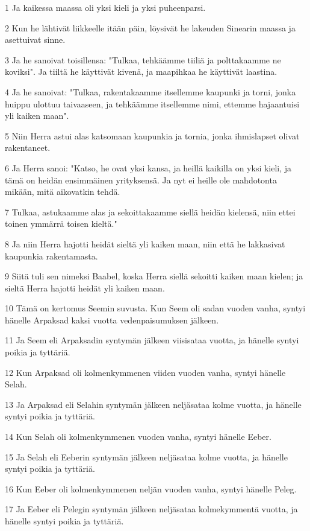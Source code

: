 \par 1 Ja kaikessa maassa oli yksi kieli ja yksi puheenparsi.
\par 2 Kun he lähtivät liikkeelle itään päin, löysivät he lakeuden Sinearin maassa ja asettuivat sinne.
\par 3 Ja he sanoivat toisillensa: "Tulkaa, tehkäämme tiiliä ja polttakaamme ne koviksi". Ja tiiltä he käyttivät kivenä, ja maapihkaa he käyttivät laastina.
\par 4 Ja he sanoivat: "Tulkaa, rakentakaamme itsellemme kaupunki ja torni, jonka huippu ulottuu taivaaseen, ja tehkäämme itsellemme nimi, ettemme hajaantuisi yli kaiken maan".
\par 5 Niin Herra astui alas katsomaan kaupunkia ja tornia, jonka ihmislapset olivat rakentaneet.
\par 6 Ja Herra sanoi: "Katso, he ovat yksi kansa, ja heillä kaikilla on yksi kieli, ja tämä on heidän ensimmäinen yrityksensä. Ja nyt ei heille ole mahdotonta mikään, mitä aikovatkin tehdä.
\par 7 Tulkaa, astukaamme alas ja sekoittakaamme siellä heidän kielensä, niin ettei toinen ymmärrä toisen kieltä."
\par 8 Ja niin Herra hajotti heidät sieltä yli kaiken maan, niin että he lakkasivat kaupunkia rakentamasta.
\par 9 Siitä tuli sen nimeksi Baabel, koska Herra siellä sekoitti kaiken maan kielen; ja sieltä Herra hajotti heidät yli kaiken maan.
\par 10 Tämä on kertomus Seemin suvusta. Kun Seem oli sadan vuoden vanha, syntyi hänelle Arpaksad kaksi vuotta vedenpaisumuksen jälkeen.
\par 11 Ja Seem eli Arpaksadin syntymän jälkeen viisisataa vuotta, ja hänelle syntyi poikia ja tyttäriä.
\par 12 Kun Arpaksad oli kolmenkymmenen viiden vuoden vanha, syntyi hänelle Selah.
\par 13 Ja Arpaksad eli Selahin syntymän jälkeen neljäsataa kolme vuotta, ja hänelle syntyi poikia ja tyttäriä.
\par 14 Kun Selah oli kolmenkymmenen vuoden vanha, syntyi hänelle Eeber.
\par 15 Ja Selah eli Eeberin syntymän jälkeen neljäsataa kolme vuotta, ja hänelle syntyi poikia ja tyttäriä.
\par 16 Kun Eeber oli kolmenkymmenen neljän vuoden vanha, syntyi hänelle Peleg.
\par 17 Ja Eeber eli Pelegin syntymän jälkeen neljäsataa kolmekymmentä vuotta, ja hänelle syntyi poikia ja tyttäriä.
